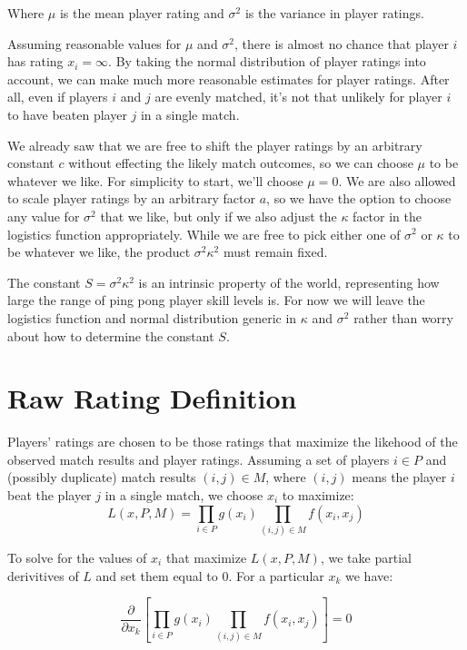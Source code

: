 \documentclass{article}
\begin{document}
Where $\mu$ is the mean player rating and $\sigma^2$ is the variance in player
ratings.

Assuming reasonable values for $\mu$ and $\sigma^2$, there is almost no chance
that player $i$ has rating $x_i = \infty$. By taking the normal distribution
of player ratings into account, we can make much more reasonable estimates for
player ratings. After all, even if players $i$ and $j$ are evenly matched,
it's not that unlikely for player $i$ to have beaten player $j$ in a single
match.

We already saw that we are free to shift the player ratings by an
arbitrary constant $c$ without effecting the likely match outcomes, so we can
choose $\mu$ to be whatever we like. For simplicity to start, we'll choose
$\mu = 0$. We are also allowed to scale player ratings by an arbitrary factor
$a$, so we have the option to choose any value for $\sigma^2$ that we like,
but only if we also adjust the $\kappa$ factor in the logistics function
appropriately. While we are free to pick either one of $\sigma^2$ or $\kappa$ to be
whatever we like, the product $\sigma^2 \kappa^2$ must remain fixed.

The constant $S = \sigma^2 \kappa^2$ is an intrinsic property of the world,
representing how large the range of ping pong player skill levels is. For now
we will leave the logistics function and normal distribution generic in $\kappa$
and $\sigma^2$ rather than worry about how to determine the constant $S$.

\section{Raw Rating Definition}
Players' ratings are chosen to be those ratings that maximize the likehood of
the observed match results and player ratings. Assuming a set of players
$i \in P$ and (possibly duplicate) match results
$(i, j) \in M$, where $(i, j)$ means the player $i$ beat the player
$j$ in a single match, we choose $x_i$ to maximize:
\begin{equation}
  L(x, P, M) = \prod_{i \in P} g(x_i)  \prod_{(i, j) \in M} f(x_i, x_j)
\end{equation}

To solve for the values of $x_i$ that maximize $L(x, P, M)$,
we take partial derivitives of $L$ and set them equal to $0$. For a particular
$x_k$ we have:

\begin{equation*}
  \frac{\partial}{\partial x_k} \left[ \prod_{i \in P} g(x_i)  \prod_{(i, j) \in M} f(x_i, x_j) \right] = 0
\end{equation*}
\end{document}
